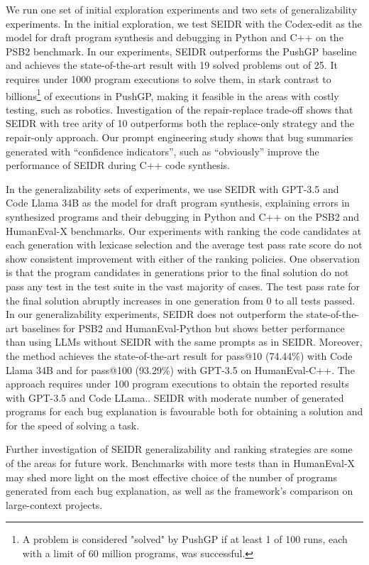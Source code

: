 We run one set of initial exploration experiments and two sets of generalizability experiments. 
In the initial exploration, we test SEIDR with the Codex-edit as the model for draft program synthesis and debugging in Python and C++ on the PSB2 benchmark. 
In our experiments, SEIDR outperforms the PushGP baseline and achieves the state-of-the-art result with 19 solved problems out of 25. 
It requires under 1000 program executions to solve them, in stark contrast to billions\footnote{A problem is considered "solved" by PushGP if at least 1 of 100 runs, each with a limit of 60 million programs, was successful.} of executions in PushGP, making it feasible in the areas with costly testing, such as robotics.
Investigation of the repair-replace trade-off shows that SEIDR with tree arity of 10 outperforms both the replace-only strategy and the repair-only approach. 
Our prompt engineering study shows that bug summaries generated with ``confidence indicators'', such as ``obviously'' improve the performance of SEIDR during C++ code synthesis. 

In the generalizability sets of experiments, we use SEIDR with GPT-3.5 and Code Llama 34B as the model for draft program synthesis, explaining errors in synthesized programs and their debugging in Python and C++ on the PSB2 and HumanEval-X benchmarks. 
Our experiments with ranking the code candidates at each generation with lexicase selection and the average test pass rate score do not show consistent improvement with either of the ranking policies. 
One observation is that the program candidates in generations prior to the final solution do not pass any test in the test suite in the vast majority of cases. 
The test pass rate for the final solution abruptly increases in one generation from 0 to all tests passed. 
In our generalizability experiments, SEIDR does not outperform the state-of-the-art baselines for PSB2 and HumanEval-Python but shows better performance than using LLMs without SEIDR with the same prompts as in SEIDR.
Moreover, the method achieves the state-of-the-art result for pass@10 (74.44\%) with Code Llama 34B and for pass@100 (93.29\%) with GPT-3.5 on HumanEval-C++. 
The approach requires under 100 program executions to obtain the reported results with GPT-3.5 and Code LLama..
SEIDR with moderate number of generated programs for each bug explanation is favourable both for obtaining a solution and for the speed of solving a task. 

Further investigation of SEIDR generalizability and ranking strategies are some of the areas for future work. 
Benchmarks with more tests than in HumanEval-X may shed more light on the most effective choice of the number of programs generated from each bug explanation, as well as the framework's comparison on large-context projects. 